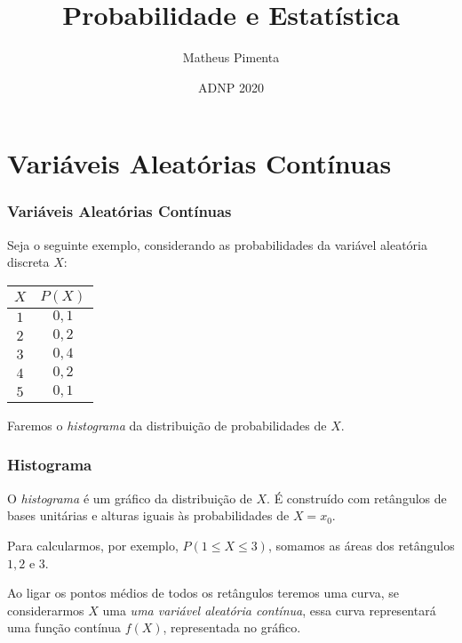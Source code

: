 \documentclass[hyperref={pdfpagelabels=false}]{beamer}
\title{Probabilidade e Estatística}
\author[Matheus Pimenta]{Matheus Pimenta}
\institute[UTFPR-CP]{\normalsize Universidade Tecnológica Federal do Paraná \\
	Câmpus Cornélio Procópio
}
\date{ADNP 2020}
\begin{document}
	
\begin{frame}
\titlepage
\end{frame} 




\section{Variáveis Aleatórias Contínuas} 

\begin{frame}
\frametitle{Variáveis Aleatórias Contínuas}

Seja o seguinte exemplo, considerando as probabilidades da variável aleatória discreta $X$:

\begin{table}[!h]
	\centering
	\begin{tabular}{|c|c|}
		\hline
		$X$	&	$P(X)$	\\\hline
		$1$	&	$0,1$	\\\hline
		$2$	&	$0,2$	\\\hline
		$3$	&	$0,4$	\\\hline
		$4$	&	$0,2$	\\\hline
		$5$	&	$0,1$	\\\hline	
	\end{tabular}
\end{table}

Faremos o \emph{histograma} da distribuição de probabilidades de $X$.


\end{frame}

\begin{frame}
\frametitle{Histograma}
O {\it histograma} é um gráfico da distribuição de $X$. É construído com retângulos de bases unitárias e alturas iguais às probabilidades de $X = x_0$.

\pause
Para calcularmos, por exemplo, $P(1\leq X \leq 3)$, somamos as áreas dos retângulos $1,2$ e $3$.

\pause
Ao ligar os pontos médios de todos os retângulos teremos uma curva, se considerarmos $X$ uma \emph{uma variável aleatória contínua}, essa curva representará uma função contínua $f(X)$, representada no gráfico.

\end{frame}
\end{document}
